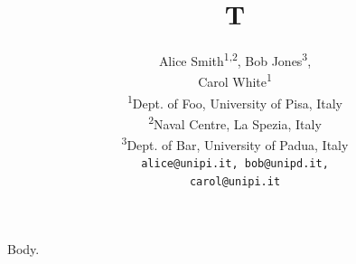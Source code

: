\documentclass[12pt,onecolumn]{IEEEtran}
\begin{document}
\author{
Alice Smith\textsuperscript{1,2}, Bob Jones\textsuperscript{3}, \\
Carol White\textsuperscript{1} \\[1em]

\textsuperscript{1}Dept. of Foo, University of Pisa, Italy \\
\textsuperscript{2}Naval Centre, La Spezia, Italy \\
\textsuperscript{3}Dept. of Bar, University of Padua, Italy \\[1em]

\texttt{alice@unipi.it, bob@unipd.it,}\\
\texttt{carol@unipi.it}
}
\title{T}
\maketitle
Body.
\end{document}

